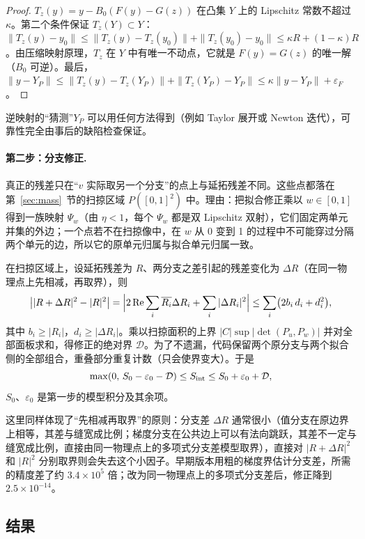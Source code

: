 \documentclass[11pt,a4paper,fontset=fandol]{ctexart}
\begin{document}
\begin{proof}
$T_z(y)=y-B_0(F(y)-G(z))$ 在凸集 $Y$ 上的 Lipschitz 常数不超过 $\kappa$。第二个条件保证 $T_z(Y)\subset Y$：$\|T_z(y)-y_0\|\le\|T_z(y)-T_z(y_0)\|+\|T_z(y_0)-y_0\|\le\kappa R+(1-\kappa)R$。由压缩映射原理，$T_z$ 在 $Y$ 中有唯一不动点，它就是 $F(y)=G(z)$ 的唯一解（$B_0$ 可逆）。最后，$\|y-Y_P\|\le\|T_z(y)-T_z(Y_P)\|+\|T_z(Y_P)-Y_P\|\le\kappa\|y-Y_P\|+\varepsilon_F$。
\end{proof}

逆映射的“猜测”$Y_P$ 可以用任何方法得到（例如 Taylor 展开或 Newton 迭代），可靠性完全由事后的缺陷检查保证。

\paragraph{第二步：分支修正.} 真正的残差只在“$v$ 实际取另一个分支”的点上与延拓残差不同。这些点都落在第~\ref{sec:mass}~节的扫掠区域 $P([0,1]^2)$ 中。理由：把拟合修正乘以 $w\in[0,1]$ 得到一族映射 $\Psi_w$（由 $\eta<1$，每个 $\Psi_w$ 都是双 Lipschitz 双射），它们固定两单元并集的外边；一个点若不在扫掠像中，在 $w$ 从 0 变到 1 的过程中不可能穿过分隔两个单元的边，所以它的原单元归属与拟合单元归属一致。

在扫掠区域上，设延拓残差为 $R$、两分支之差引起的残差变化为 $\Delta R$（在同一物理点上先相减，再取界），则
\[
\bigl||R+\Delta R|^2-|R|^2\bigr|=\Bigl|2\operatorname{Re}\sum_i\overline{R_i}\Delta R_i+\sum_i|\Delta R_i|^2\Bigr|\le\sum_i\bigl(2b_i\,d_i+d_i^2\bigr),
\]
其中 $b_i\ge|R_i|$，$d_i\ge|\Delta R_i|$。乘以扫掠面积的上界 $|C|\sup|\det(P_u,P_w)|$ 并对全部面板求和，得修正的绝对界 $\mathcal D$。为了不遗漏，代码保留两个原分支与两个拟合侧的全部组合，重叠部分重复计数（只会使界变大）。于是
\[
\max(0,\,S_0-\varepsilon_0-\mathcal D)\le S_{\rm int}\le S_0+\varepsilon_0+\mathcal D ,
\]
$S_0$、$\varepsilon_0$ 是第一步的模型积分及其余项。

\begin{remark}
这里同样体现了“先相减再取界”的原则：分支差 $\Delta R$ 通常很小（值分支在原边界上相等，其差与缝宽成比例；梯度分支在公共边上可以有法向跳跃，其差不一定与缝宽成比例，直接由同一物理点上的多项式分支差模型取界），直接对 $|R+\Delta R|^2$ 和 $|R|^2$ 分别取界则会失去这个小因子。早期版本用粗的梯度界估计分支差，所需的精度差了约 $3.4\times10^5$ 倍；改为同一物理点上的多项式分支差后，修正降到 $2.5\times10^{-14}$。
\end{remark}

\subsection{结果}
\end{document}
